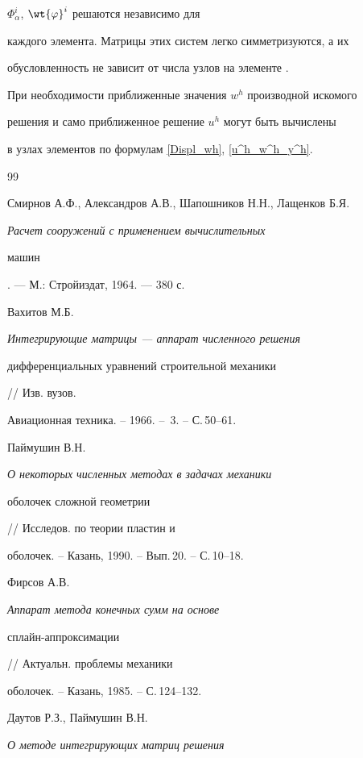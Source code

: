 $\Phi_\alpha^i$, $\wt{ \varphi}^i$ решаются независимо для


каждого элемента. Матрицы этих систем легко симметризуются, а их


обусловленность не зависит от числа узлов на элементе \cite{DautPaim}.





При необходимости  приближенные значения $w^h$ производной искомого


решения и  само приближенное решение $u^h$ могут быть вычислены


в узлах элементов по формулам \eqref{Displ_wh}, \eqref{u^h_w^h_y^h}.





\begin{thebibliography}{99}







Смирнов А.Ф., Александров А.В., Шапошников Н.Н., Лащенков Б.Я.


{\em Расчет сооружений с применением вычислительных


машин}. --- М.: Стройиздат, 1964. --- 380 с.




Вахитов М.Б. {\em Интегрирующие матрицы --- аппарат численного решения


дифференциальных уравнений строительной механики} // Изв. вузов.


Авиационная техника. -- 1966. -- \No\,3. -- С.\,50--61.




Паймушин В.Н. {\em О некоторых численных методах в задачах механики


оболочек сложной геометрии} // Исследов. по теории пластин и


оболочек. -- Казань, 1990. -- Вып.\,20. -- С.\,10--18.




Фирсов А.В. {\em Аппарат метода конечных сумм на основе


сплайн-аппроксимации} // Актуальн. проблемы механики


оболочек. -- Казань, 1985. -- С.\,124--132.




Даутов Р.З., Паймушин В.Н. {\em О методе интегрирующих матриц решения


}
\end{thebibliography}
